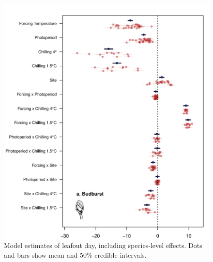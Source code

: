 \documentclass{article}
\begin{document}
\clearpage

\begin{figure}
\includegraphics[width=1\textwidth, page=2]{Fig1_bb_lo+sp}
\caption{Model estimates of leafout day, including species-level effects. Dots and bars show mean and 50\% credible intervals.}
\label{fig:figS3}
\end{figure}
\end{document}
